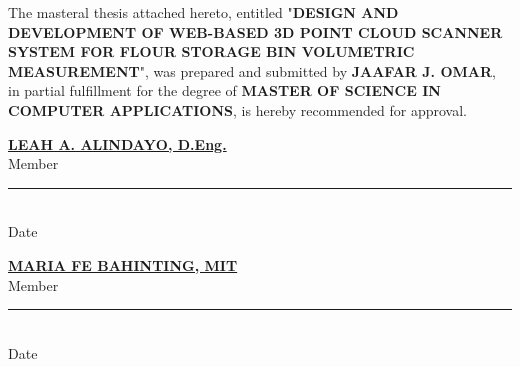 \vspace{1cm}

\begin{adjustwidth}{25pt}{-12pt}
	\begin{singlespace}
		The masteral thesis attached hereto, entitled "\MakeUppercase{\textbf{Design and Development of Web-based 3D Point Cloud Scanner System for Flour Storage Bin Volumetric Measurement}}", was prepared and submitted by \textbf{JAAFAR J. OMAR}, in partial fulfillment for the degree of \textbf{MASTER OF SCIENCE IN COMPUTER APPLICATIONS}, is hereby recommended for approval.
	\end{singlespace}
\end{adjustwidth}

\vspace{0.3cm}
\begin{center}
	\begin{minipage}{0.54\textwidth}
		\begin{center}
			\textbf{\underline{\MakeUppercase{Leah A. Alindayo}, D.Eng.}}\\
			\vspace{0.1cm}
			Member\\
			\vspace{0.2cm}
			\rule{4.5cm}{0.5pt}\\
			\vspace{-0.3cm}
			Date
		\end{center}
	\end{minipage}
	\hfill
	\begin{minipage}{0.45\textwidth}
		\begin{center}
			\textbf{\underline{\MakeUppercase{Maria Fe Bahinting}, MIT}}\\
			\vspace{0.1cm}
			Member\\
			\vspace{0.2cm}
			\rule{4.5cm}{0.5pt}\\
			\vspace{-0.3cm}
			Date
		\end{center}
	\end{minipage}
\end{center}

